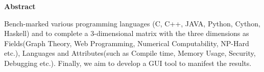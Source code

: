 \vspace*{0.5in}
\begin{center}
\begin{large}
{\bf Abstract}
\end{large}
\end{center}

Bench-marked various programming languages (C, C++, JAVA, Python, Cython, Haskell) and to complete a 3-dimensional matrix with the three dimensions as Fields(Graph Theory, Web Programming, Numerical Computability, NP-Hard etc.), Languages and Attributes(such as Compile time, Memory Usage, Security, Debugging etc.). Finally, we aim to develop a GUI tool to manifest the results.

\vspace*{\fill}

